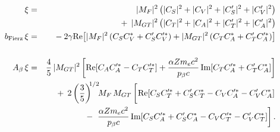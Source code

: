 %
%
%
\begin{eqnarray}
    \xi &=& 
    	|M_F|^2    \left( |C_S|^2 + |C_V|^2 + |C_S^\prime|^2 + |C_V^\prime|^2 \right) 
		\nonumber \\ && + \;\,
		|M_{GT}|^2 \left( |C_T|^2 + |C_A|^2 + |C_T^\prime|^2 + |C_A^\prime|^2 \right)
		\label{eq:jtw_xi_integrated} \\
    \bFierz \, \xi &=& 
    	- \: 2 \gamma 
		\textrm{Re}\!\left[ |M_F|^2 \left( C_S C_V^* + C_S^\prime C_V^{\prime *} \right) 
    	+ |M_{GT}|^2 \left( C_T C_A^* + C_T^{\prime} C_A^{\prime *} \right) \right] 
		\nonumber \\
    	\label{eq:jtw_bxi_integrated} \\
    \Abeta \, \xi &=& 
    	\frac{4}{5} \, |M_{GT}|^2 \left[ \textrm{Re}\!\left[ C_A C_A^{\prime *} - C_T C_T^{\prime *} \right] + \frac{\alpha Z \me c^2}{\pbeta c} \,\textrm{Im}\!\left[ C_T C_A^{\prime *} + C_T^\prime C_A^* \right] \right] 
		\nonumber \\ && + \;\, 
		2 %
		\left( \frac{3}{5} \right)^{\!\! 1/2} \!\!
		M_F\,M_{GT}  \left[ \phantom{\frac{1}{1}\!\!\!\!} \textrm{Re} \! \left[ C_S C_T^{\prime *} +  C_S^\prime C_T^* - C_V C_A^{\prime *} - C_V^\prime C_A^* \right] 
		\right.
		\nonumber \\ && - \;
		\left.
		\frac{\alpha Z \me c^2}{\pbeta c} \,\textrm{Im}\!\left[ C_S C_A^{\prime *} + C_S^\prime C_A^* - C_V C_T^{\prime *} -C_V^\prime C_T^* \right] \right].
	\label{eq:jtw_Abetaxi_integrated}
\end{eqnarray}
%
%